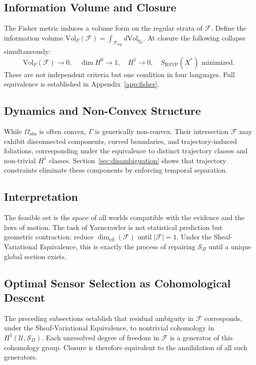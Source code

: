 \documentclass[11pt, oneside]{article}
\begin{document}
\subsection{Information Volume and Closure}

The Fisher metric induces a volume form on the regular strata of $\mathcal{F}$. Define
the information volume $\mathrm{Vol}_F(\mathcal{F}) = \int_{\mathcal{F}_{\mathrm{reg}}}
d\mathrm{Vol}_{g_F}$. At closure the following collapse simultaneously:
\[
\mathrm{Vol}_F(\mathcal{F}) \to 0,\quad
\dim H^0 \to 1,\quad
H^1 \to 0,\quad
S_{\mathrm{RSVP}}(X^*) \text{ minimized.}
\]
These are not independent criteria but one condition in four languages.
Full equivalence is established in Appendix~\ref{app:fisher}.

\subsection{Dynamics and Non-Convex Structure}

While $\Omega_{\mathrm{obs}}$ is often convex, $\Gamma$ is generically non-convex.
Their intersection $\mathcal{F}$ may exhibit disconnected components, curved boundaries,
and trajectory-induced foliations, corresponding under the equivalence to distinct
trajectory classes and non-trivial $H^1$ classes. Section~\ref{sec:disambiguation}
shows that trajectory constraints eliminate these components by enforcing temporal
separation.

\subsection{Interpretation}

The feasible set is the space of all worlds compatible with the evidence and the laws of
motion. The task of Yarncrawler is not statistical prediction but geometric contraction:
reduce $\dim_{\mathrm{eff}}(\mathcal{F})$ until $|\mathcal{F}| = 1$. Under the
Sheaf-Variational Equivalence, this is exactly the process of repairing $\mathcal{S}_\Pi$
until a unique global section exists.

\subsection{Optimal Sensor Selection as Cohomological Descent}

The preceding subsections establish that residual ambiguity in $\mathcal{F}$ corresponds,
under the Sheaf-Variational Equivalence, to nontrivial cohomology in
$H^1(\mathcal{U}, \mathcal{S}_\Pi)$. Each unresolved degree of freedom in $\mathcal{F}$
is a generator of this cohomology group. Closure is therefore equivalent to the
annihilation of all such generators.
\end{document}
